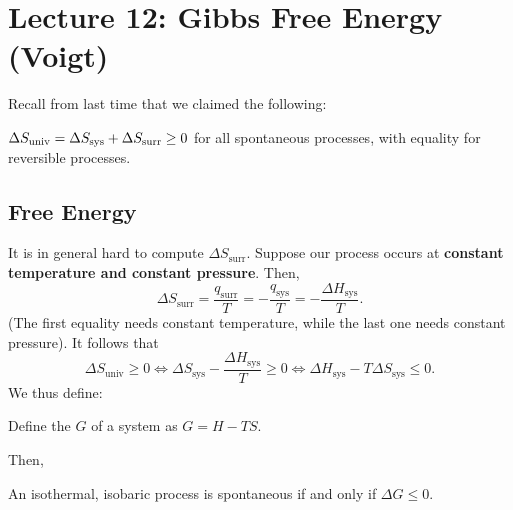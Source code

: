 \section*{Lecture 12: Gibbs Free Energy (Voigt)}
\setcounter{section}{12}

Recall from last time that we claimed the following:

\begin{law}
	$\Delta S_{\textnormal{univ}} = \Delta S_{\textnormal{sys}} + \Delta S_{\textnormal{surr}} \geq 0$ for all spontaneous processes, with equality for reversible processes.
\end{law}

\subsection{Free Energy}

It is in general hard to compute $\Delta S_{\text{surr}}$. Suppose our process occurs at \textbf{constant temperature and constant pressure}. Then, \[
	\Delta S_{\text{surr}} = \frac{q_{\text{surr}}}{T} = -\frac{q_\text{sys}}{T} = -\frac{\Delta H_{\text{sys}}}{T}.
\]
(The first equality needs constant temperature, while the last one needs constant pressure).
It follows that \[
	\Delta S_{\text{univ}} \geq 0 \iff \Delta S_{\text{sys}} - \frac{\Delta H_{\text{sys}}}{T} \geq 0\iff \Delta H_{\text{sys}} - T\Delta S_{\text{sys}} \leq 0.
\]
We thus define:
\begin{defn}
	Define the  $G$ of a system as $G = H - TS$.
\end{defn}

Then, 

\begin{thm}
	An isothermal, isobaric process is spontaneous if and only if $\Delta G \leq 0$.
\end{thm}

